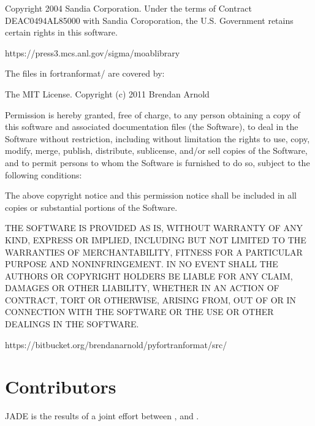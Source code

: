 \documentclass[letterpaper,10pt,english]{sphinxmanual}
\begin{document}
\begin{sphinxVerbatim}[commandchars=\\\{\}]
Copyright 2004 Sandia Corporation.  Under the terms of Contract
DE\PYGZhy{}AC04\PYGZhy{}94AL85000 with Sandia Coroporation, the U.S. Government
retains certain rights in this software.

https://press3.mcs.anl.gov/sigma/moab\PYGZhy{}library

\PYGZhy{}\PYGZhy{}\PYGZhy{}\PYGZhy{}\PYGZhy{}\PYGZhy{}\PYGZhy{}\PYGZhy{}\PYGZhy{}\PYGZhy{}\PYGZhy{}\PYGZhy{}\PYGZhy{}\PYGZhy{}\PYGZhy{}\PYGZhy{}\PYGZhy{}\PYGZhy{}\PYGZhy{}\PYGZhy{}\PYGZhy{}\PYGZhy{}\PYGZhy{}\PYGZhy{}\PYGZhy{}\PYGZhy{}\PYGZhy{}\PYGZhy{}\PYGZhy{}\PYGZhy{}\PYGZhy{}\PYGZhy{}\PYGZhy{}\PYGZhy{}\PYGZhy{}\PYGZhy{}\PYGZhy{}\PYGZhy{}\PYGZhy{}\PYGZhy{}\PYGZhy{}\PYGZhy{}\PYGZhy{}\PYGZhy{}\PYGZhy{}\PYGZhy{}\PYGZhy{}\PYGZhy{}\PYGZhy{}\PYGZhy{}\PYGZhy{}\PYGZhy{}\PYGZhy{}\PYGZhy{}\PYGZhy{}\PYGZhy{}\PYGZhy{}\PYGZhy{}\PYGZhy{}\PYGZhy{}\PYGZhy{}\PYGZhy{}\PYGZhy{}\PYGZhy{}\PYGZhy{}\PYGZhy{}\PYGZhy{}\PYGZhy{}\PYGZhy{}\PYGZhy{}\PYGZhy{}\PYGZhy{}\PYGZhy{}\PYGZhy{}\PYGZhy{}\PYGZhy{}\PYGZhy{}\PYGZhy{}\PYGZhy{}
The files in fortranformat/ are covered by: 

The MIT License. Copyright (c) 2011 Brendan Arnold

Permission is hereby granted, free of charge, to any person obtaining a copy
of this software and associated documentation files (the \PYGZdq{}Software\PYGZdq{}), to deal
in the Software without restriction, including without limitation the rights
to use, copy, modify, merge, publish, distribute, sublicense, and/or sell
copies of the Software, and to permit persons to whom the Software is
furnished to do so, subject to the following conditions:

The above copyright notice and this permission notice shall be included in
all copies or substantial portions of the Software.

THE SOFTWARE IS PROVIDED \PYGZdq{}AS IS\PYGZdq{}, WITHOUT WARRANTY OF ANY KIND, EXPRESS OR
IMPLIED, INCLUDING BUT NOT LIMITED TO THE WARRANTIES OF MERCHANTABILITY,
FITNESS FOR A PARTICULAR PURPOSE AND NONINFRINGEMENT. IN NO EVENT SHALL THE
AUTHORS OR COPYRIGHT HOLDERS BE LIABLE FOR ANY CLAIM, DAMAGES OR OTHER
LIABILITY, WHETHER IN AN ACTION OF CONTRACT, TORT OR OTHERWISE, ARISING FROM,
OUT OF OR IN CONNECTION WITH THE SOFTWARE OR THE USE OR OTHER DEALINGS IN
THE SOFTWARE.

https://bitbucket.org/brendanarnold/py\PYGZhy{}fortranformat/src/
\end{sphinxVerbatim}


\chapter{Contributors}
\label{\detokenize{contributors:contributors}}\label{\detokenize{contributors::doc}}
\sphinxAtStartPar
JADE is the results of a joint effort between ,
and .
\end{document}
